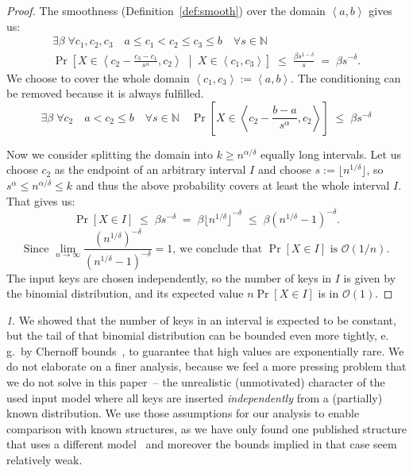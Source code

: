 \documentclass[
submission
]{dmtcs-episciences}
\theoremstyle{plain}
\theoremstyle{definition}
\theoremstyle{remark}
\newtheorem*{rem*}{\protect\remarkname}
\theoremstyle{plain}
\theoremstyle{plain}
\providecommand{\remarkname}{Remark}
\def\interval#1#2{\left\langle#1,#2\right\rangle}
\def\eqspaces{\;=\;}
\def\lespaces{\;\le\;}
\def\Prob#1{\Pr\!\left[#1\right]}
\def\OO{\mathcal O}
\def\natural{\mathbb{N}}
\begin{document}
\begin{proof}
The smoothness (Definition~\ref{def:smooth}) over the domain $\interval a b$ gives us:
\begin{multline*}
	\exists\beta \; \forall c_1,c_2,c_3 \quad a \le c_1 < c_2 \le c_3 \le b \quad \forall s \in \natural \\
		\Prob{  X \in \interval{ c_2 - \frac{c_3-c_1}{s^\alpha} }{c_2} \; \middle| \; X \in \interval{c_1}{c_3}  }
		\lespaces \frac{\beta s^{1-\delta}}{s}  \eqspaces  \beta s^{-\delta}.
\end{multline*}
We choose to cover the whole domain $\interval{c_1}{c_3} := \interval a b$. The conditioning can be removed because it is always fulfilled.
\[
	\exists\beta \; \forall c_2 \quad a < c_2 \le b \quad \forall s \in \natural \quad
		\Prob{  X \in \interval{ c_2 - \frac{b-a}{s^\alpha} }{c_2}  }
		\lespaces \beta s^{-\delta}
\]

Now we consider splitting the domain into $k \ge n^{\alpha / \delta}$ equally long intervals.
Let us choose $c_2$ as the endpoint of an arbitrary
interval $I$ and choose $s:= \lfloor n^{1 / \delta} \rfloor$, so
$ s^\alpha \le n^{\alpha / \delta} \le k $ and thus the above probability covers at least the whole interval $I$. That gives us:
\[	\Prob{X \in I} \lespaces \beta s^{-\delta}
	\eqspaces \beta {\lfloor n^{1 / \delta} \rfloor}^{-\delta}
	\lespaces \beta \left( n^{1 / \delta} - 1 \right) ^{-\delta}.
\] \[
\text{Since } \lim_{n \to \infty}
	\frac{ ( n^{1 / \delta} ) ^{-\delta} }{ ( n^{1 / \delta} - 1 ) ^{-\delta} }
	= 1 \text{, we conclude that } \Prob{X \in I} \text{ is } \OO(1/n).
\]
%
The input keys are chosen independently, so the number of keys in $I$ is given by the binomial distribution, and its expected value
$n \Prob{X \in I}$ is in $\OO(1)$.
\end{proof}

\begin{rem*}
We showed that the number of keys in an interval is expected to be constant, but the tail of that binomial distribution can be bounded even more tightly, e.\,g.~by Chernoff bounds~\cite[chapter~4.1]{randomAlgs}, to guarantee that high values are exponentially rare.
We do not elaborate on a finer analysis, because we feel a more pressing problem that we do not solve in this paper~-- the unrealistic (unmotivated) character of the used input model where all keys are inserted \emph{independently} from a (partially) known distribution.
We use those assumptions for our analysis to enable comparison with known structures, as we have only found one published structure that uses a different model~\cite{DemaineJP04} and moreover the bounds implied in that case seem relatively weak.
\end{rem*}
\end{document}
